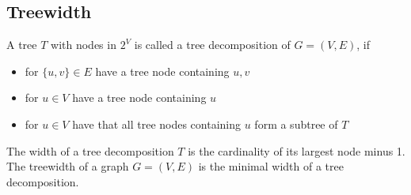 \documentclass{scrartcl}
\begin{document}
\subsection{Treewidth}

A tree $T$ with nodes in $2^V$ is called a tree decomposition of $G = (V, E)$, if
\begin{itemize}
    \item for $\{u, v\} \in E$ have a tree node containing $u, v$
    \item for $u \in V$ have a tree node containing $u$
    \item for $u \in V$ have that all tree nodes containing $u$ form a subtree of $T$
\end{itemize}
The width of a tree decomposition $T$ is the cardinality of its largest node minus 1.
The treewidth of a graph $G = (V, E)$ is the minimal width of a tree decomposition. 
\end{document}

